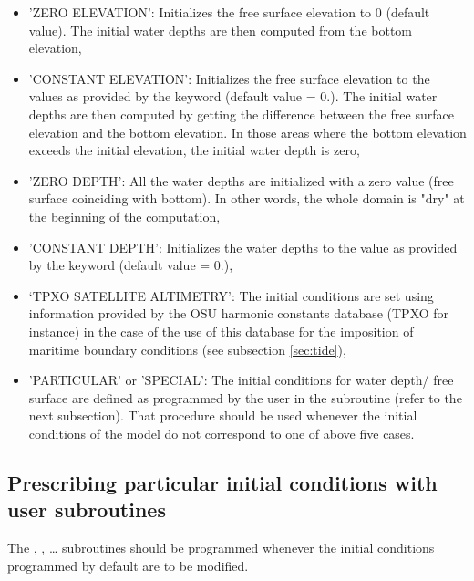 \begin{itemize}
\item 'ZERO ELEVATION': Initializes the free surface elevation
to 0 (default value). The initial water depths are then computed from the
bottom elevation,

\item 'CONSTANT ELEVATION': Initializes the free surface elevation to the
values as provided by the keyword 
(default value = 0.). The initial water
depths are then computed by getting the difference between the free surface
elevation and the bottom elevation.
In those areas where the bottom elevation exceeds
the initial elevation, the initial water depth is zero,

\item 'ZERO DEPTH': All the water depths are initialized with a zero value
(free surface coinciding with bottom). In other words, the whole domain is
"dry" at the beginning of the computation,

\item 'CONSTANT DEPTH': Initializes the water depths to the value as provided
by the keyword  (default value = 0.),

\item `TPXO SATELLITE ALTIMETRY': The initial conditions are set using
information provided by the OSU harmonic constants database (TPXO for instance)
in the case of the use of this database for the imposition of maritime boundary
conditions (see subsection \ref{sec:tide}),

\item 'PARTICULAR' or 'SPECIAL': The initial conditions for water depth/
free surface are defined as programmed by the user
in the  subroutine (refer to the next
subsection).
That procedure should be used whenever the initial conditions of the model do 
not correspond to one of above five cases.
\end{itemize}


\subsection{Prescribing particular initial conditions with user subroutines}
\label{sec:prescr_IC}

The , ,
\ldots
subroutines should be programmed whenever the initial
conditions programmed by default are to be modified.

